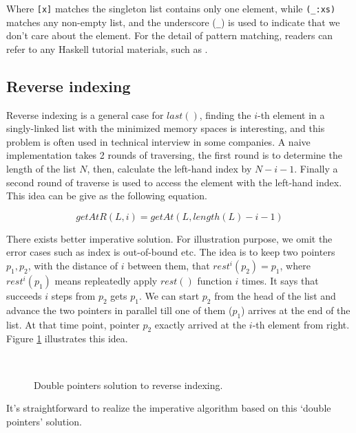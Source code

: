 \documentclass{article}
\begin{document}
Where \verb|[x]| matches the singleton list contains only one element, while \verb|(_:xs)| matches any non-empty list,
and the underscore (\verb|_|) is used to indicate that we don't care about the element. For the detail of pattern matching,
readers can refer to any Haskell tutorial materials, such as \cite{learn-haskell}.

\subsection{Reverse indexing}
Reverse indexing is a general case for $last()$, finding the $i$-th element in a singly-linked list
with the minimized memory spaces is interesting, and this problem is often used in technical interview
in some companies. A naive implementation takes 2 rounds of traversing, the first round is to determine
the length of the list $N$, then, calculate the left-hand index by $N - i - 1$. Finally a second round
of traverse is used to access the element with the left-hand index. This idea can be give as the 
following equation.

\[
  getAtR(L, i) = getAt(L, length(L) - i -1)
\]

There exists better imperative solution. For illustration purpose, we omit the error cases such
as index is out-of-bound etc. The idea is to keep two pointers $p_1, p_2$, with the distance
of $i$ between them, that $rest^i(p_2) = p_1$, where $rest^i(p_1)$ means repleatedly apply $rest()$ function
$i$ times. It says that succeeds $i$ steps from $p_2$ gets $p_1$. We can start $p_2$ from the head
of the list and advance the two pointers in parallel till one of them ($p_1$) arrives at the end
of the list. At that time point, pointer $p_2$ exactly arrived at the $i$-th element from right.
Figure \ref{fig:list-rindex} illustrates this idea.

\begin{figure}[htbp]
    \centering
     \\
    \caption{Double pointers solution to reverse indexing.} \label{fig:list-rindex}
\end{figure}

It's straightforward to realize the imperative algorithm based on this `double pointers' solution.
\end{document}
